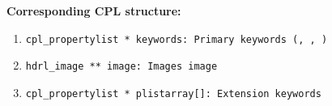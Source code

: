 \begin{datastructdef}
\textbf{Corresponding \ac{CPL} structure:}
\begin{enumerate}
    \item \texttt{cpl\_propertylist * keywords: Primary keywords (\hyperref[fits:pro.catg]{},  \hyperref[fits:pro.tech]{},  \hyperref[fits:det.id]{})}
    \item \texttt{hdrl\_image ** image: Images image}
    \item \texttt{cpl\_propertylist * plistarray[]: Extension keywords}
\end{enumerate}
\end{datastructdef}


\paragraph{\hyperref[dataitem:badpix_map_det]{}}\label{dataitem:badpix_map_det}\label{dataitem:badpixmap}

